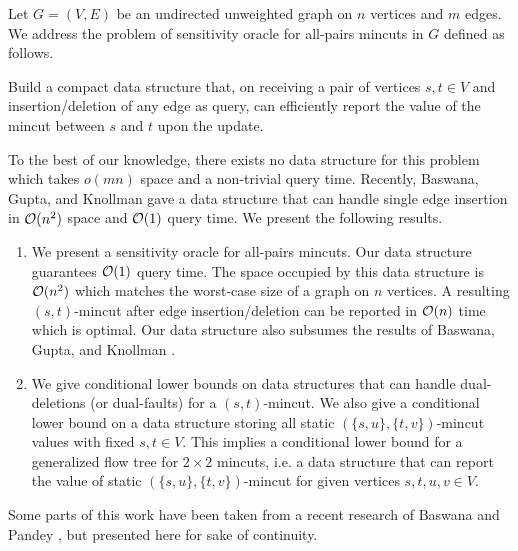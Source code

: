 % 
% 
%

Let $G=(V,E)$ be an undirected unweighted graph on $n$ vertices and $m$ edges. We address the problem of sensitivity oracle for all-pairs mincuts in $G$ defined as follows.

Build a compact data structure that, on receiving a pair of vertices $s,t\in V$ and insertion/deletion of any edge as query, can efficiently report the value of the mincut between $s$ and $t$ upon the update.

To the best of our knowledge, there exists no data structure for this problem which takes $o(mn)$ space and a non-trivial query time. Recently, Baswana, Gupta, and Knollman \cite{DBLP:conf/esa/BaswanaGK20} gave a data structure that can handle single edge insertion in ${\cal O}(n^2)$ space and ${\cal O}(1)$ query time. We present the following results.

\begin{enumerate}
    \item We present a sensitivity oracle for all-pairs mincuts. Our data structure guarantees ${\cal O}(1)$ query time. The space occupied by this data structure is ${\cal O}(n^2)$ which matches the worst-case size of a graph on $n$ vertices. A resulting $(s,t)$-mincut after edge insertion/deletion can be reported in ${\cal O}(n)$ time which is optimal. Our data structure also subsumes the results of Baswana, Gupta, and Knollman \cite{DBLP:conf/esa/BaswanaGK20}.
    \item We give conditional lower bounds on data structures that can handle dual-deletions (or dual-faults) for a $(s,t)$-mincut. We also give a conditional lower bound on a data structure storing all static $(\{s,u\},\{t,v\})$-mincut values with fixed $s,t \in V$. This implies a conditional lower bound for a generalized flow tree for $2 \times 2$ mincuts, i.e. a data structure that can report the value of static $(\{s,u\},\{t,v\})$-mincut for given vertices $s,t,u,v \in V$.
\end{enumerate}

Some parts of this work have been taken from a recent research of Baswana and Pandey \cite{DBLP:journals/corr/BaswanaP20}, but presented here for sake of continuity. 
